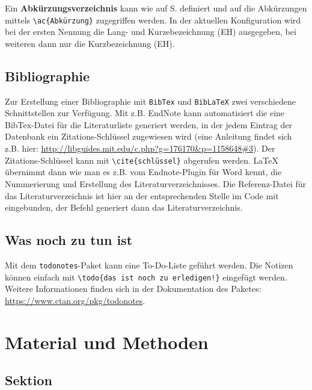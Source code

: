 \documentclass{scrreprt}
\begin{document}
Ein \textbf{Abkürzungsverzeichnis} kann wie auf S. \pageref{sec:abk_Verz} definiert und auf die Abkürzungen mittels \verb|\ac{Abkürzung}| zugegriffen werden. In der aktuellen Konfiguration wird bei der ersten Nennung die Lang- und Kurzebezeichnung (\ac{EH}) ausgegeben, bei weiteren dann nur die Kurzbezeichnung (\ac{EH}). 


\section{Bibliographie}

Zur Erstellung einer Bibliographie mit \verb|BibTex| und \verb|BibLaTeX| zwei verschiedene Schnittstellen zur Verfügung. Mit z.B. EndNote kann automatisiert die eine BibTex-Datei für die Literaturliste generiert werden, in der jedem Eintrag der Datenbank ein Zitations-Schlüssel zugewiesen wird (eine Anleitung findet sich z.B. hier: \url{http://libguides.mit.edu/c.php?g=176170&p=1158648#3}). Der Zitations-Schlüssel kann mit \verb|\cite{schlüssel}| abgerufen werden. LaTeX übernimmt dann wie man es z.B. vom Endnote-Plugin für Word kennt, die Nummerierung und Erstellung des Literaturverzeichnisses. 
Die Referenz-Datei für das Literaturverzeichnis ist hier an der entsprechenden Stelle im Code mit \\ \verb|| eingebunden, der Befehl  \verb|| generiert dann das Literaturverzeichnis. 

\section{Was noch zu tun ist}
Mit dem \verb|todonotes|-Paket kann eine To-Do-Liste geführt werden. Die Notizen können einfach mit \verb|\todo{das ist noch zu erledigen!}| eingefügt werden. Weitere Informationen finden sich in der Dokumentation des Paketes: \url{https://www.ctan.org/pkg/todonotes}.


\chapter{Material und Methoden}\label{sec:materialmethoden}

\section{Sektion}\label{sec:Sektion1}
\end{document}
